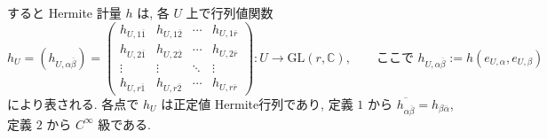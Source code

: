 \documentclass[dvipdfmx,a4paper,11pt]{article} %
\theoremstyle{definition}
\theoremstyle{remark}
\numberwithin{equation}{section}
\newcommand{\C}{\mathbb{C}}
\begin{document}
すると Hermite 計量 \(h\) は, 各 \(U\) 上で行列値関数
\begin{equation}
h_U=(h_{U,\alpha\overline{\beta}})
=
\begin{pmatrix}
h_{U,1\overline 1}& h_{U,1\overline 2} & \cdots & h_{U,1\overline r} \\
h_{U,2\overline 1} & h_{U,2\overline 2} & \cdots & h_{U,2\overline r}\\
\vdots & \vdots & \ddots & \vdots\\
h_{U,r\overline 1}&h_{U,r\overline 2}  & \cdots & h_{U,r\overline r}
\end{pmatrix}
:
U \to \mathrm{GL}(r, \C),
\qquad 
\text{ここで } h_{U,\alpha\overline{\beta}}:=h(e_{U,\alpha},e_{U,\beta})
\end{equation}
により表される. 各点で \(h_U\) は正定値 Hermite行列であり, 定義 \(1\) から \(\overline{h_{\alpha\overline{\beta}}}=h_{\beta \overline{\alpha}}\), 定義 \(2\) から \(C^{\infty}\) 級である.
\end{document}
